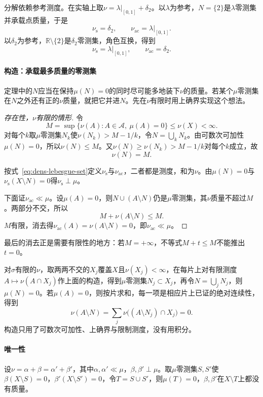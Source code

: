 分解依赖参考测度。在实轴上取$\nu=\lambda|_{[0,1]}+\delta_2$。以$\lambda$为参考，$N=\{2\}$是$\lambda$零测集并承载点质量，于是
\[
\nu_{\mathrm s}=\delta_2,\qquad\nu_{\mathrm{ac}}=\lambda|_{[0,1]} .
\]
以$\delta_2$为参考，$\mathbb R\setminus\{2\}$是$\delta_2$零测集，角色互换，得到
\[
\nu_{\mathrm s}=\lambda|_{[0,1]},\qquad\nu_{\mathrm{ac}}=\delta_2 .
\]

\paragraph{构造：承载最多质量的零测集}
定理中的$N$应当在保持$\mu(N)=0$的同时尽可能多地装下$\nu$的质量。若某个$\mu$零测集在$N$之外还有正的$\nu$质量，就把它并进$N$。先在$\nu$有限时用上确界实现这个想法。

\begin{proof}[存在性，$\nu$有限的情形]
令
\[
M=\sup\{\nu(A):A\in\mathcal A,\ \mu(A)=0\}\leq\nu(X)<\infty .
\]
对每个$k$取$\mu$零测集$N_k$使$\nu(N_k)>M-1/k$，令$N=\bigcup_kN_k$。由可数次可加性$\mu(N)=0$，所以$\nu(N)\leq M$。又$\nu(N)\geq\nu(N_k)>M-1/k$对每个$k$成立，故
\[
\nu(N)=M .
\]

按式~\eqref{eq:dens-lebesgue-set}定义$\nu_{\mathrm s}$与$\nu_{\mathrm{ac}}$，二者都是测度，和为$\nu$。由$\mu(N)=0$与$\nu_{\mathrm s}(X\setminus N)=0$得$\nu_{\mathrm s}\perp\mu$。

下面证$\nu_{\mathrm{ac}}\ll\mu$。设$\mu(A)=0$，则$N\cup(A\setminus N)$仍是$\mu$零测集，其$\nu$质量不超过$M$。两部分不交，所以
\[
M+\nu(A\setminus N)\leq M .
\]
$M$有限，消去得$\nu_{\mathrm{ac}}(A)=\nu(A\setminus N)=0$，即$\nu_{\mathrm{ac}}\ll\mu$。
\end{proof}

最后的消去正是需要有限性的地方：若$M=+\infty$，不等式$M+t\leq M$不能推出$t=0$。

对$\sigma$有限的$\nu$，取两两不交的$X_j$覆盖$X$且$\nu(X_j)<\infty$，在每片上对有限测度$A\mapsto\nu(A\cap X_j)$作上面的构造，得到$\mu$零测集$N_j\subset X_j$，再令$N=\bigcup_jN_j$，则$\mu(N)=0$。若$\mu(A)=0$，则按片求和，每一项是相应片上已证的绝对连续性，得到
\[
\nu(A\setminus N)=\sum_j\nu\bigl((A\setminus N_j)\cap X_j\bigr)=0 .
\]
构造只用了可数次可加性、上确界与限制测度，没有用积分。

\paragraph{唯一性}
设$\nu=\alpha+\beta=\alpha'+\beta'$，其中$\alpha,\alpha'\ll\mu$，$\beta,\beta'\perp\mu$。取$\mu$零测集$S,S'$使$\beta(X\setminus S)=0$，$\beta'(X\setminus S')=0$，令$T=S\cup S'$，则$\mu(T)=0$，$\beta,\beta'$在$X\setminus T$上都没有质量。

